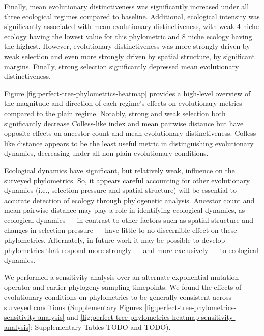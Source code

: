 Finally, mean evolutionary distinctiveness was significantly increased under all three ecological regimes compared to baseline.
Additional, ecological intensity was significantly associated with mean evolutionary distinctiveness, with weak 4 niche ecology having the lowest value for this phylometric and 8 niche ecology having the highest.
However, evolutionary distinctiveness was more strongly driven by weak selection and even more strongly driven by spatial structure, by significant margins.
Finally, strong selection significantly depressed mean evolutionary distinctiveness. 



Figure \ref{fig:perfect-tree-phylometrics-heatmap} provides a high-level overview of the magnitude and direction of each regime's effects on evolutionary metrics compared to the plain regime.
Notably, strong and weak selection both significantly decrease Colless-like index and mean pairwise distance but have opposite effects on ancestor count and mean evolutionary distinctiveness.
Colless-like distance appears to be the least useful metric in distinguishing evolutionary dynamics, decreasing under all non-plain evolutionary conditions.

Ecological dynamics have significant, but relatively weak, influence on the surveyed phylometrics.
So, it appears careful accounting for other evolutionary dynamics (i.e., selection pressure and spatial structure) will be essential to accurate detection of ecology through phylogenetic analysis.
Ancestor count and mean pairwise distance may play a role in identifying ecological dynamics, as ecological dynamics --- in contrast to other factors such as spatial structure and changes in selection pressure --- have little to no discernible effect on these phylometrics. 
Alternately, in future work it may be possible to develop phylometrics that respond more strongly --- and more exclusively --- to ecological dynamics.

We performed a sensitivity analysis over an alternate exponential mutation operator and earlier phylogeny sampling timepoints.
We found the effects of evolutionary conditions on phylometrics to be generally consistent across surveyed conditions (Supplementary Figures \ref{fig:perfect-tree-phylometrics-sensitivity-analysis} and \ref{fig:perfect-tree-phylometrics-heatmap-sensitivity-analysis}; Supplementary Tables TODO and TODO). 

